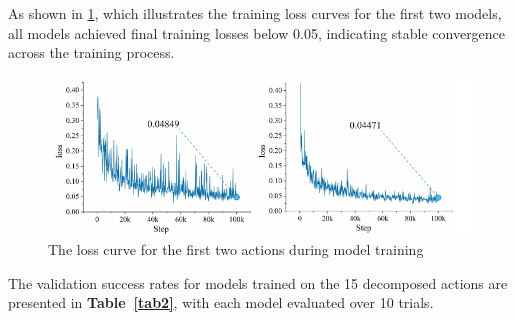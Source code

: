 \documentclass[runningheads]{llncs}
\begin{document}
As shown in \cref{fig14}, which illustrates the training loss curves for the first two models, all models achieved final training losses below 0.05, indicating stable convergence across the training process.


\begin{figure}
\centering
\includegraphics[width=323pt]{fig15.pdf}
\caption{The loss curve for the first two actions during model training} \label{fig14}
\end{figure}


The validation success rates for models trained on the 15 decomposed actions are presented in \textbf{Table~\ref{tab2}}, with each model evaluated over 10 trials. 
\end{document}
